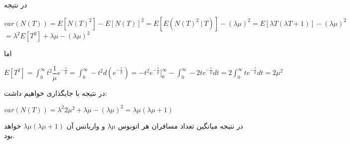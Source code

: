 \documentclass{scribe-cgenomics}
\begin{document}
\begin{حل}
در نتیجه

\begin{center}
$
var(N(T))
= E[N(T)^2] - E[N(T)]^2
= E[E(N(T)^2\ |\ T)] - (\lambda\mu)^2
= E[\lambda T (\lambda T + 1)] - (\lambda \mu)^2
$
\bigbreak
$
= \lambda^2 E[T^2] + \lambda \mu - (\lambda \mu)^2
$
\end{center}

اما

\begin{center}
$
E[T^2] 
= \int_{0}^{\infty} t^2 \dfrac{1}{\mu} e^{-\frac{t}{\mu}}
= \int_{0}^{\infty} -t^2 d(e^{-\frac{t}{\mu}})
= -t^2e^{-\frac{t}{\mu}}\big]_{0}^{\infty} - \int_{0}^{\infty} -2t e^{-\frac{t}{\mu}}dt
= 2\int_{0}^{\infty}te^{-\frac{t}{\mu}}dt
= 2\mu^2
$
\end{center}

در نتیجه با جایگذاری خواهیم داشت:

\begin{center}
$
var(N(T)) = \lambda^2 2\mu^2 + \lambda \mu - (\lambda \mu)^2 = \lambda \mu (\lambda \mu + 1)
$
\end{center}

در نتیجه میانگین تعداد مسافران هر اتوبوس
$\lambda \mu$
و واریانس آن
$ \lambda \mu (\lambda \mu + 1)$
خواهد بود.

\end{حل}

\newpage


\end{document}
